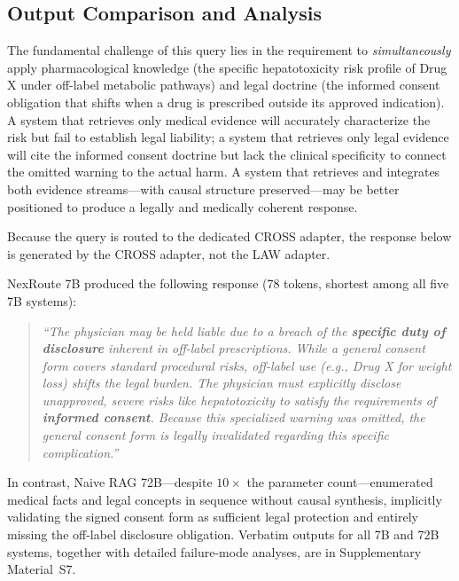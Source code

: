 \documentclass[a4paper,fleql,doubleblind]{cas-sc}
\begin{document}
\subsection{Output Comparison and Analysis}
\label{ssec:output}
The fundamental challenge of this query lies in the requirement to
\emph{simultaneously} apply pharmacological knowledge (the specific
hepatotoxicity risk profile of Drug X under off-label metabolic pathways) and
legal doctrine (the informed consent obligation that shifts when a drug is
prescribed outside its approved indication). A system that retrieves only
medical evidence will accurately characterize the risk but fail to establish
legal liability; a system that retrieves only legal evidence will cite the
informed consent doctrine but lack the clinical specificity to connect the
omitted warning to the actual harm. A system that retrieves and integrates both evidence streams---with causal
structure preserved---may be better positioned to produce a legally and
medically coherent response.

Because the query is routed to the dedicated CROSS adapter, the response below
is generated by the CROSS adapter, not the LAW adapter.

NexRoute 7B produced the following response (78 tokens, shortest among all five 7B systems):
\begin{quote}\small
\textit{``The physician may be held liable due to a breach of the \textbf{specific duty of disclosure} inherent in off-label prescriptions. While a general consent form covers standard procedural risks, off-label use (e.g., Drug X for weight loss) shifts the legal burden. The physician must explicitly disclose unapproved, severe risks like hepatotoxicity to satisfy the requirements of \textbf{informed consent}. Because this specialized warning was omitted, the general consent form is legally invalidated regarding this specific complication.''}
\end{quote}
In contrast, Naive RAG 72B---despite $10\times$ the parameter count---enumerated medical facts and legal concepts in sequence without causal synthesis, implicitly validating the signed consent form as sufficient legal protection and entirely missing the off-label disclosure obligation. Verbatim outputs for all 7B and 72B systems, together with detailed failure-mode analyses, are in Supplementary Material~S7.
\end{document}
